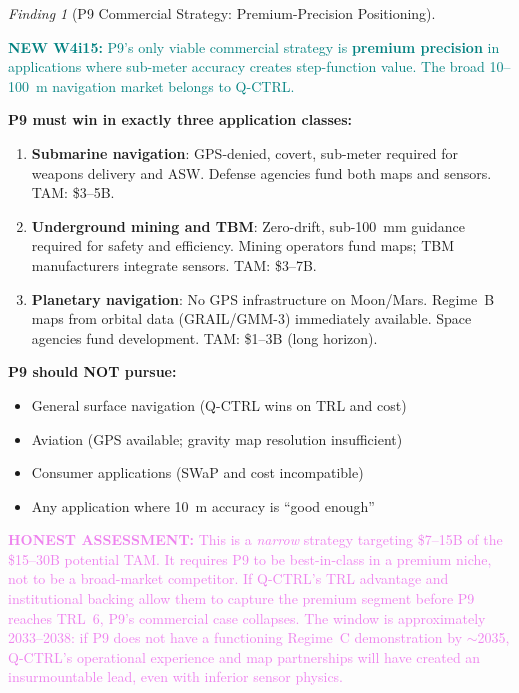 \documentclass[11pt]{article}
\theoremstyle{definition}
\theoremstyle{remark}
\newtheorem{finding}[theorem]{Finding}
\newcommand{\honest}[1]{\textcolor{violet}{\textbf{HONEST ASSESSMENT:} #1}}
\newcommand{\newfinding}[1]{\textcolor{teal}{\textbf{NEW W4i15:} #1}}
\begin{document}
\begin{finding}[P9 Commercial Strategy: Premium-Precision Positioning]
\label{find:commercial-strategy}

\newfinding{P9's only viable commercial strategy is \textbf{premium
precision} in applications where sub-meter accuracy creates step-function
value. The broad 10--100~m navigation market belongs to Q-CTRL.}

\textbf{P9 must win in exactly three application classes:}
\begin{enumerate}[nosep]
\item \textbf{Submarine navigation}: GPS-denied, covert, sub-meter
  required for weapons delivery and ASW. Defense agencies fund both
  maps and sensors. TAM: \$3--5B.
\item \textbf{Underground mining and TBM}: Zero-drift, sub-100~mm
  guidance required for safety and efficiency. Mining operators fund
  maps; TBM manufacturers integrate sensors. TAM: \$3--7B.
\item \textbf{Planetary navigation}: No GPS infrastructure on Moon/Mars.
  Regime~B maps from orbital data (GRAIL/GMM-3) immediately available.
  Space agencies fund development. TAM: \$1--3B (long horizon).
\end{enumerate}

\textbf{P9 should NOT pursue:}
\begin{itemize}[nosep]
\item General surface navigation (Q-CTRL wins on TRL and cost)
\item Aviation (GPS available; gravity map resolution insufficient)
\item Consumer applications (SWaP and cost incompatible)
\item Any application where 10~m accuracy is ``good enough''
\end{itemize}

\honest{This is a \emph{narrow} strategy targeting \$7--15B of the
\$15--30B potential TAM. It requires P9 to be best-in-class in a
premium niche, not to be a broad-market competitor. If Q-CTRL's
TRL advantage and institutional backing allow them to capture the
premium segment before P9 reaches TRL~6, P9's commercial case
collapses. The window is approximately 2033--2038: if P9 does not
have a functioning Regime~C demonstration by $\sim$2035, Q-CTRL's
operational experience and map partnerships will have created
an insurmountable lead, even with inferior sensor physics.}
\end{finding}
\end{document}
